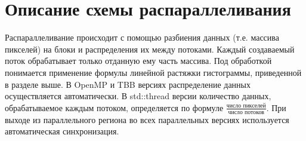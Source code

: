 \documentclass{report}
\begin{document}
\section*{Описание схемы распараллеливания}
\par Распараллеливание происходит с помощью разбиения данных (т.е. массива пикселей) на блоки и распределения их между потоками. Каждый создаваемый поток обрабатывает только отданную ему часть массива. Под обработкой понимается применение формулы линейной растяжки гистограммы, приведенной в разделе выше. В OpenMP и TBB версиях распределение данных осуществляется автоматически. В std::thread версии количество данных, обрабатываемое каждым потоком, определяется по формуле $\frac{\text{число пикселей}}{\text{число потоков}}$. При выходе из параллельного региона во всех параллельных версиях используется автоматическая синхронизация.

\newpage

\end{document}
